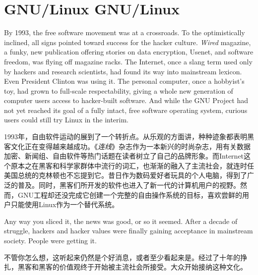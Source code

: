 \chapter{\ifdefined\eng
GNU/Linux
\fi
\ifdefined\chs
GNU/Linux
\fi}

\ifdefined\eng
By 1993, the free software movement was at a crossroads. To the optimistically inclined, all signs pointed toward success for the hacker culture. \textit{Wired} magazine, a funky, new publication offering stories on data encryption, Usenet, and software freedom, was flying off magazine racks. The Internet, once a slang term used only by hackers and research scientists, had found its way into mainstream lexicon. Even President Clinton was using it. The personal computer, once a hobbyist's toy, had grown to full-scale respectability, giving a whole new generation of computer users access to hacker-built software. And while the GNU Project had not yet reached its goal of a fully intact, free software operating system, curious users could still try Linux in the interim.
\fi

\ifdefined\chs
1993年，自由软件运动的展到了一个转折点。从乐观的方面讲，种种迹象都表明黑客文化正在变得越来越成功。《\textit{连线}》杂志作为一本新兴的时尚杂志，用有关数据加密、新闻组、自由软件等热门话题在读者树立了自己的品牌形象。而Internet这个原本之在黑客和科学家群体中流行的词汇，也渐渐的融入了主流社会，就连时任美国总统的克林顿也不忘提到它。昔日作为数码爱好者玩具的个人电脑，得到了广泛的普及。同时，黑客们所开发的软件也进入了新一代的计算机用户的视野。然而，GNU工程却还没完成它创建一个完整的自由操作系统的目标，喜欢尝鲜的用户只能使用Linux作为一个替代系统。
\fi

\ifdefined\eng
Any way you sliced it, the news was good, or so it seemed. After a decade of struggle, hackers and hacker values were finally gaining acceptance in mainstream society. People were getting it.
\fi

\ifdefined\chs
不管你怎么想，这听起来仍然是个好消息，或者至少看起来是。经过了十年的挣扎，黑客和黑客的价值观终于开始被主流社会所接受。大众开始接纳这种文化。
\fi

